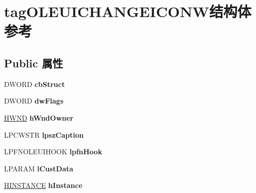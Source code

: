 \hypertarget{structtag_o_l_e_u_i_c_h_a_n_g_e_i_c_o_n_w}{}\section{tag\+O\+L\+E\+U\+I\+C\+H\+A\+N\+G\+E\+I\+C\+O\+N\+W结构体 参考}
\label{structtag_o_l_e_u_i_c_h_a_n_g_e_i_c_o_n_w}
\subsection*{Public 属性}
\begin{DoxyCompactItemize}
\item 
\mbox{\label{structtag_o_l_e_u_i_c_h_a_n_g_e_i_c_o_n_w_a9f2132fdc488438eab43ef37324c3d64}} 
D\+W\+O\+RD {\bfseries cb\+Struct}
\item 
\mbox{\label{structtag_o_l_e_u_i_c_h_a_n_g_e_i_c_o_n_w_ad3f042b7964cac0a881b10a1dceef5f6}} 
D\+W\+O\+RD {\bfseries dw\+Flags}
\item 
\mbox{\label{structtag_o_l_e_u_i_c_h_a_n_g_e_i_c_o_n_w_a7bb6af99cca8509d51f7bc9a401d1dfc}} 
\hyperlink{interfacevoid}{H\+W\+ND} {\bfseries h\+Wnd\+Owner}
\item 
\mbox{\label{structtag_o_l_e_u_i_c_h_a_n_g_e_i_c_o_n_w_afedb0a3570ae49c5f25e6847c2dadbb5}} 
L\+P\+C\+W\+S\+TR {\bfseries lpsz\+Caption}
\item 
\mbox{\label{structtag_o_l_e_u_i_c_h_a_n_g_e_i_c_o_n_w_a3a4bc94cb67dbe69a4bbc8de0b13b3e1}} 
L\+P\+F\+N\+O\+L\+E\+U\+I\+H\+O\+OK {\bfseries lpfn\+Hook}
\item 
\mbox{\label{structtag_o_l_e_u_i_c_h_a_n_g_e_i_c_o_n_w_aceb47592ced0167831329aa8131a5fff}} 
L\+P\+A\+R\+AM {\bfseries l\+Cust\+Data}
\item 
\mbox{\label{structtag_o_l_e_u_i_c_h_a_n_g_e_i_c_o_n_w_a4ada587e7d6b60a4d4b97508d0d0f8e7}} 
\hyperlink{interfacevoid}{H\+I\+N\+S\+T\+A\+N\+CE} {\bfseries h\+Instance}

\end{DoxyCompactItemize}
